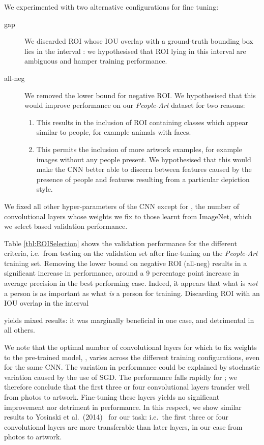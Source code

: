 \documentclass[runningheads]{llncs}
\begin{document}
We experimented with two alternative configurations for fine tuning:
\begin{description}
  \item[gap] We discarded \ac{ROI} whose \ac{IOU} overlap with a ground-truth bounding box lies in the interval
    : 
    we hypothesised that \ac{ROI} lying in this interval are ambiguous and hamper training performance. 
  \item[all-neg] We removed the lower bound for negative \ac{ROI}.
    We hypothesised that this would improve performance on our \textit{People-Art} dataset for two reasons:
    \begin{enumerate}
      \item This results in the inclusion of \ac{ROI} containing classes which appear similar to people, for example animals with faces.
      \item This permits the inclusion of more artwork examples, for example images without any people present.
            We hypothesised that this would make the \ac{CNN} better able to discern between features caused by the presence of people and features resulting from a particular depiction style.
    \end{enumerate}
\end{description}
We fixed all other hyper-parameters of the \ac{CNN} except for
,
the number of convolutional layers whose weights we fix to those learnt from ImageNet, which we select based validation performance.

Table \ref{tbl:ROISelection} shows the validation performance for the different criteria, i.e.\ from testing on the validation set after fine-tuning on the \textit{People-Art} training set.
Removing the lower bound on negative \ac{ROI} (all-neg) results in a significant increase in performance, around a 9 percentage point increase in average precision in the best performing case.
Indeed, it appears that what is \emph{not} a person is as important as what \emph{is} a person for training.
Discarding \ac{ROI} with an \ac{IOU} overlap in the interval

yields mixed results: it was marginally beneficial in one case, and detrimental in all others.

We note that the optimal number of convolutional layers for which to fix weights to the pre-trained model,
, varies across the different training configurations, even for the same \ac{CNN}.
The variation in performance could be explained by stochastic variation caused by the use of \ac{SGD}.
The performance falls rapidly for
;
we therefore conclude that the first three or four convolutional layers transfer well from \acp{photo} to artwork.
Fine-tuning these layers yields no significant improvement nor detriment in performance.
In this respect, we show similar results to Yosinski et al.\ (2014)~\cite{yosinski2014transferable} for our task: i.e.\ the first three or four convolutional layers are more transferable than later layers, in our case from \acp{photo} to \ac{artwork}.
\end{document}
